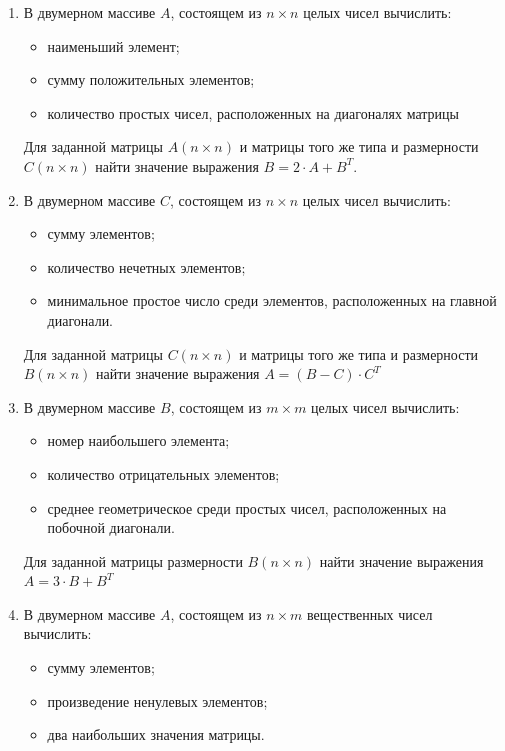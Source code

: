 \begin{enumerate}
\item В двумерном массиве $A$, состоящем из $n\times n$ целых чисел вычислить: 
\begin{itemize}
\item наименьший элемент;
\item сумму положительных элементов;
\item количество простых чисел, расположенных на диагоналях матрицы
\end{itemize}
Для заданной матрицы $A(n\times n)$ и матрицы того же типа и размерности
$C(n\times n)$ найти значение выражения  $B=2\cdot A+B^T$.

\item В двумерном массиве $C$, состоящем из $n\times n$ целых чисел вычислить:
\begin{itemize}
\item сумму элементов;
\item количество нечетных элементов;
\item минимальное простое число среди элементов, расположенных на главной диагонали.
\end{itemize}

Для заданной матрицы $C(n\times n)$ и матрицы того же типа и размерности
$B(n\times n)$ найти значение выражения  $A=(B-C)\cdot C^T$  

\item В двумерном массиве $B$, состоящем из $m\times m$ целых чисел вычислить: 
\begin{itemize}
\item номер наибольшего элемента;
\item количество отрицательных элементов;
\item среднее геометрическое среди простых чисел, расположенных на побочной диагонали.
\end{itemize}

Для заданной матрицы размерности $B(n\times n)$ найти значение выражения  $A=3\cdot B+B^T$  

\item В двумерном массиве $A$, состоящем из $n\times m$ вещественных чисел вычислить: 
\begin{itemize}
\item сумму элементов;
\item произведение ненулевых элементов;
\item два наибольших значения матрицы.
\end{itemize}


\end{enumerate}
